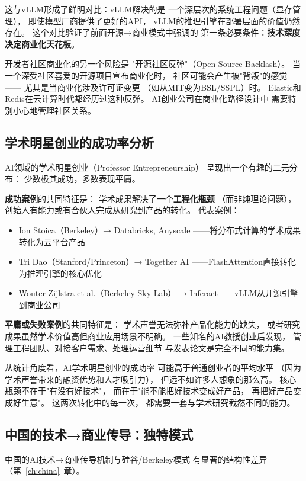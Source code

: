 这与vLLM形成了鲜明对比：vLLM解决的是
一个深层次的系统工程问题（显存管理），
即使模型厂商提供了更好的API，
vLLM的推理引擎在部署层面的价值仍然存在。
这个对比验证了前面开源→商业模式中强调的
第一条必要条件：\textbf{技术深度决定商业化天花板}。

开发者社区商业化的另一个风险是
"开源社区反弹"（Open Source Backlash）。
当一个深受社区喜爱的开源项目宣布商业化时，
社区可能会产生被"背叛"的感觉——
尤其是当商业化涉及许可证变更
（如从MIT变为BSL/SSPL）时。
Elastic和Redis在云计算时代都经历过这种反弹。
AI创业公司在商业化路径设计中
需要特别小心地管理社区关系。


\subsection{学术明星创业的成功率分析}

AI领域的学术明星创业（Professor Entrepreneurship）
呈现出一个有趣的二元分布：
少数极其成功，多数表现平庸。

\textbf{成功案例}的共同特征是：
学术成果解决了一个\textbf{工程化瓶颈}
（而非纯理论问题），
创始人有能力或有合伙人完成从研究到产品的转化。
代表案例：
\begin{itemize}
  \item Ion Stoica（Berkeley）→ Databricks, Anyscale
    ——将分布式计算的学术成果转化为云平台产品
  \item Tri Dao（Stanford/Princeton）→ Together AI
    ——FlashAttention直接转化为推理引擎的核心优化
  \item Wouter Zijlstra et al.（Berkeley Sky Lab）
    → Inferact——vLLM从开源引擎到商业公司
\end{itemize}

\textbf{平庸或失败案例}的共同特征是：
学术声誉无法弥补产品化能力的缺失，
或者研究成果虽然学术价值高但商业应用场景不明确。
一些知名的AI教授创业后发现，
管理工程团队、对接客户需求、处理运营细节
与发表论文是完全不同的能力集。

从统计角度看，AI学术明星创业的成功率
可能高于普通创业者的平均水平
（因为学术声誉带来的融资优势和人才吸引力），
但远不如许多人想象的那么高。
核心瓶颈不在于"有没有好技术"，
而在于"能不能把好技术变成好产品，
再把好产品变成好生意"。
这两次转化中的每一次，
都需要一套与学术研究截然不同的能力。

\subsection{中国的技术→商业传导：独特模式}

中国的AI技术→商业传导机制与硅谷/Berkeley模式
有显著的结构性差异（第~\ref{ch:china}~章）。


